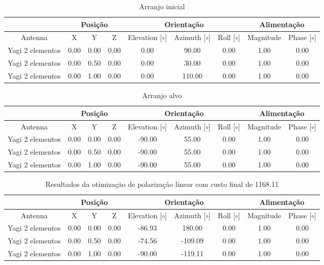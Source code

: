 \begin{table}[H]
    \centering
    \tiny
    \begin{tabular}{c|c|c|c|c|c|c|c|c}
         & \multicolumn{3}{|c|}{Posição} & \multicolumn{3}{|c|}{Orientação} & \multicolumn{2}{|c}{Alimentação} \\
         \hline
        Antenna & X & Y & Z & Elevation [$\circ$] & Azimuth [$\circ$] & Roll [$\circ$] & Magnitude & Phase [$\circ$] \\
        \hline
        Yagi 2 elementos & 0.00 & 0.00 & 0.00 & 0.00 & 90.00 & 0.00 & 1.00 & 0.00 \\
        Yagi 2 elementos & 0.00 & 0.50 & 0.00 & 0.00 & 30.00 & 0.00 & 1.00 & 0.00 \\
        Yagi 2 elementos & 0.00 & 1.00 & 0.00 & 0.00 & 110.00 & 0.00 & 1.00 & 0.00 \\
    \end{tabular}
    \caption{Arranjo inicial}
    \label{tab:Arranjo Arranjo inicial - otimização linear não convergida}
\end{table}
\begin{table}[H]
    \centering
    \tiny
    \begin{tabular}{c|c|c|c|c|c|c|c|c}
         & \multicolumn{3}{|c|}{Posição} & \multicolumn{3}{|c|}{Orientação} & \multicolumn{2}{|c}{Alimentação} \\
         \hline
        Antenna & X & Y & Z & Elevation [$\circ$] & Azimuth [$\circ$] & Roll [$\circ$] & Magnitude & Phase [$\circ$] \\
        \hline
        Yagi 2 elementos & 0.00 & 0.00 & 0.00 & -90.00 & 55.00 & 0.00 & 1.00 & 0.00 \\
        Yagi 2 elementos & 0.00 & 0.50 & 0.00 & -90.00 & 55.00 & 0.00 & 1.00 & 0.00 \\
        Yagi 2 elementos & 0.00 & 1.00 & 0.00 & -90.00 & 55.00 & 0.00 & 1.00 & 0.00 \\
    \end{tabular}
    \caption{Arranjo alvo}
    \label{tab:Arranjo Arranjo alvo de polarização linear - otimização não convergida}
\end{table}
\begin{table}[H]
    \centering
    \tiny
    \begin{tabular}{c|c|c|c|c|c|c|c|c}
         & \multicolumn{3}{|c|}{Posição} & \multicolumn{3}{|c|}{Orientação} & \multicolumn{2}{|c}{Alimentação} \\
         \hline
        Antenna & X & Y & Z & Elevation [$\circ$] & Azimuth [$\circ$] & Roll [$\circ$] & Magnitude & Phase [$\circ$] \\
        \hline
        Yagi 2 elementos & 0.00 & 0.00 & 0.00 & -86.93 & 180.00 & 0.00 & 1.00 & 0.00 \\
        Yagi 2 elementos & 0.00 & 0.50 & 0.00 & -74.56 & -109.09 & 0.00 & 1.00 & 0.00 \\
        Yagi 2 elementos & 0.00 & 1.00 & 0.00 & -90.00 & -119.11 & 0.00 & 1.00 & 0.00 \\
    \end{tabular}
    \caption{Resultados da otimização de polarização linear com custo final de 1168.11}
    \label{tab:Arranjo Arranjo final otimizado - otimização não convergida}
\end{table}
